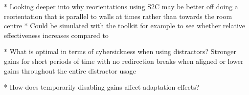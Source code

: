    * Looking deeper into why reorientations using S2C may be better off doing a reorientation that is parallel to walls at times rather than towards the room centre
      * Could be simulated with the toolkit for example to see whether relative effectiveness increases compared to 
      
   * What is optimal in terms of cybersickness when using distractors? Stronger gains for short periods of time with no redirection breaks when aligned or lower gains throughout the entire distractor usage
   
   * How does temporarily disabling gains affect adaptation effects?